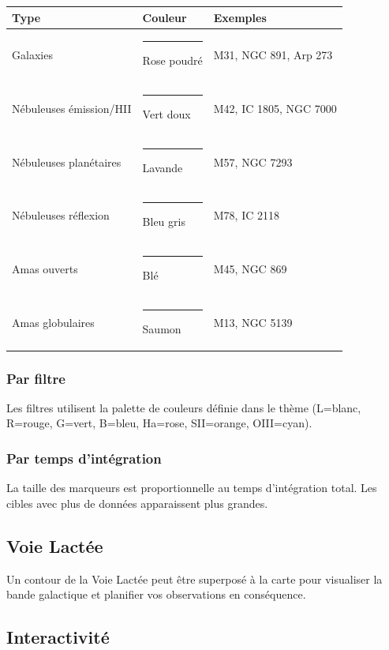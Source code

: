 \documentclass[a4paper,11pt]{article}
\begin{document}
\begin{center}
\begin{tabularx}{0.85\textwidth}{l l X}
\toprule
\textbf{Type} & \textbf{Couleur} & \textbf{Exemples} \\
\midrule
Galaxies & \textcolor[HTML]{b89898}{\rule{1cm}{8pt}} Rose poudr\'{e} & M31, NGC 891, Arp 273 \\
N\'{e}buleuses \'{e}mission/HII & \textcolor[HTML]{90b098}{\rule{1cm}{8pt}} Vert doux & M42, IC 1805, NGC 7000 \\
N\'{e}buleuses plan\'{e}taires & \textcolor[HTML]{a8a0c0}{\rule{1cm}{8pt}} Lavande & M57, NGC 7293 \\
N\'{e}buleuses r\'{e}flexion & \textcolor[HTML]{90a0b8}{\rule{1cm}{8pt}} Bleu gris & M78, IC 2118 \\
Amas ouverts & \textcolor[HTML]{b8b090}{\rule{1cm}{8pt}} Bl\'{e} & M45, NGC 869 \\
Amas globulaires & \textcolor[HTML]{c0a898}{\rule{1cm}{8pt}} Saumon & M13, NGC 5139 \\
\bottomrule
\end{tabularx}
\end{center}

\subsubsection{Par filtre}

Les filtres utilisent la palette de couleurs d\'{e}finie dans le th\`{e}me (L=blanc, R=rouge, G=vert, B=bleu, Ha=rose, SII=orange, OIII=cyan).

\subsubsection{Par temps d'int\'{e}gration}

La taille des marqueurs est proportionnelle au temps d'int\'{e}gration total. Les cibles avec plus de donn\'{e}es apparaissent plus grandes.

\subsection{Voie Lact\'{e}e}

Un contour de la Voie Lact\'{e}e peut \^{e}tre superpos\'{e} \`{a} la carte pour visualiser la bande galactique et planifier vos observations en cons\'{e}quence.

\subsection{Interactivit\'{e}}
\end{document}
